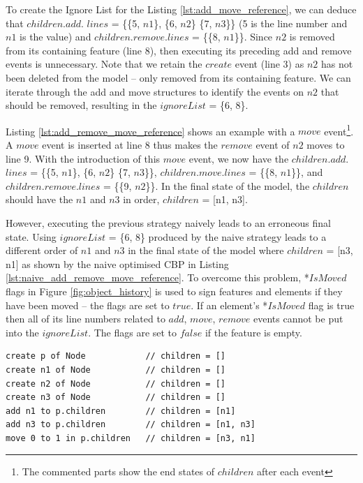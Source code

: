 \documentclass{llncs}
\begin{document}
{    To create the Ignore List for the Listing \ref{lst:add_move_reference}, we can deduce that $children$.$add$. $lines$ = \{\{5, $n1$\}, \{6, $n2$\} \{7, $n3$\}\} (5 is the line number and $n1$ is the value) and $children$.$remove$.$lines$ = \{\{8, $n1$\}\}. Since $n2$ is removed from its containing feature (line 8), then executing its preceding add and remove events is unnecessary. Note that we retain the $create$ event (line 3) as $n2$ has not been deleted from the model -- only removed from its containing feature. We can iterate through the add and move structures to identify the events on $n2$ that should be removed, resulting in the $ignoreList$ = \{6, 8\}.
    
    Listing \ref{lst:add_remove_move_reference} shows an example with a $move$ event\footnote{The commented parts  show the end states of $children$ after each event}. A $move$ event is inserted at line 8 thus makes the $remove$ event of $n2$  moves to line 9. With the introduction of this $move$ event, we now have the $children$.$add$.$lines$ = \{\{5, $n1$\}, \{6, $n2$\} \{7, $n3$\}\}, $children$.$move$.$lines$ = \{\{8, $n1$\}\}, and $children$.$remove$.$lines$ = \{\{9, $n2$\}\}. In the final state of the model, the $children$ should have the $n1$ and $n3$ in order, $children$ = [n1, n3].  
    
    However, executing the previous strategy naively leads to an erroneous final state. Using $ignoreList$ = \{6, 8\} produced by the naive strategy leads to a different order of $n1$ and $n3$ in the final state of the model where $children$ = [n3, n1] as shown by the naive optimised CBP in Listing \ref{lst:naive_add_remove_move_reference}. To overcome this problem, *$IsMoved$ flags in Figure \ref{fig:object_history} is used to sign  features and elements if they have been moved -- the flags are set to $true$. If an element's *$IsMoved$ flag is true then all of its line numbers related to $add$, $move$, $remove$ events cannot be put into the $ignoreList$. The flags are set to $false$ if the feature is empty. 

\begin{lstlisting}[style=eol,caption={A naive optimised CBP representation of original CBP representation in Listing \ref{lst:add_remove_move_reference} .},label=lst:naive_add_remove_move_reference]
create p of Node            // children = []
create n1 of Node           // children = []
create n2 of Node           // children = []
create n3 of Node           // children = []
add n1 to p.children        // children = [n1]
add n3 to p.children        // children = [n1, n3]
move 0 to 1 in p.children   // children = [n3, n1]
\end{lstlisting}

}
\end{document}
